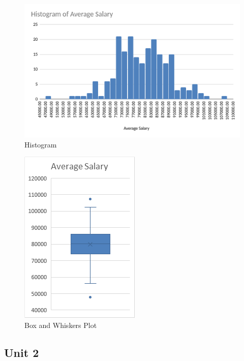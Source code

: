 \documentclass[11pt]{article} %
\begin{document}
\begin{figure}[H]
  \includegraphics[scale=0.25,center]{figure3.png}
  \caption{Histogram}
  \label{fig:fig3}
\end{figure}
\begin{figure}[H]
  \includegraphics[scale=0.5,center]{figure4.png}
  \caption{Box and Whiskers Plot}
  \label{fig:fig4}
\end{figure}

\subsection{Unit 2}
\end{document}
